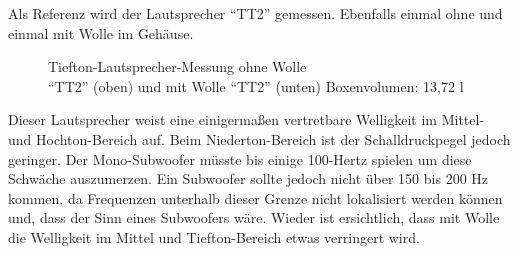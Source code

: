 \newpage
Als Referenz wird der Lautsprecher \enquote{TT2} gemessen. 
Ebenfalls einmal ohne und einmal mit Wolle im Gehäuse.
\begin{figure} [H]
	\centering
	\quad
	\caption{Tiefton-Lautsprecher-Messung ohne Wolle\\ \enquote{TT2} (oben) und mit Wolle \enquote{TT2} (unten) Boxenvolumen: 13,72 l}
	\label{fig:4.2.4.2}
\end{figure}
Dieser Lautsprecher weist eine einigermaßen vertretbare Welligkeit im Mittel- und Hochton-Bereich auf.
Beim Niederton-Bereich ist der Schalldruckpegel jedoch geringer.
Der Mono-Subwoofer müsste bis einige 100-Hertz spielen um diese Schwäche auszumerzen.
Ein Subwoofer sollte jedoch nicht über 150 bis 200 Hz kommen, da Frequenzen unterhalb dieser Grenze nicht lokalisiert werden können und, dass der Sinn eines Subwoofers wäre.
Wieder ist ersichtlich, dass mit Wolle die Welligkeit im Mittel und Tiefton-Bereich etwas verringert wird.

